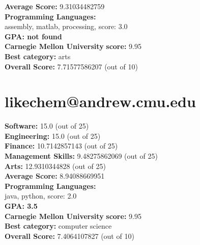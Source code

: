 \documentclass{article}
\begin{document}
\textbf{Average Score: } 9.31034482759\\
\textbf{Programming Languages:} \\
assembly, matlab, processing, score: 3.0\\
\textbf{GPA: not found}\\
\textbf{Carnegie Mellon University} \textbf{score:} 9.95\\
\textbf{Best category: } arts\\
\textbf{Overall Score: }7.71577586207 (out of 10)\section{likechem@andrew.cmu.edu}
\textbf{Software:} 15.0 (out of 25)\\
\textbf{Engineering: } 15.0 (out of 25)\\
\textbf{Finance:} 10.7142857143 (out of 25)\\
\textbf{Management Skills:} 9.48275862069 (out of 25)\\
\textbf{Arts:} 12.9310344828 (out of 25)\\
\textbf{Average Score: } 8.94088669951\\
\textbf{Programming Languages:} \\
java, python, score: 2.0\\
\textbf{GPA: 3.5}\\
\textbf{Carnegie Mellon University} \textbf{score:} 9.95\\
\textbf{Best category: } computer science\\
\textbf{Overall Score: }7.4064107827 (out of 10)
\end{document}
